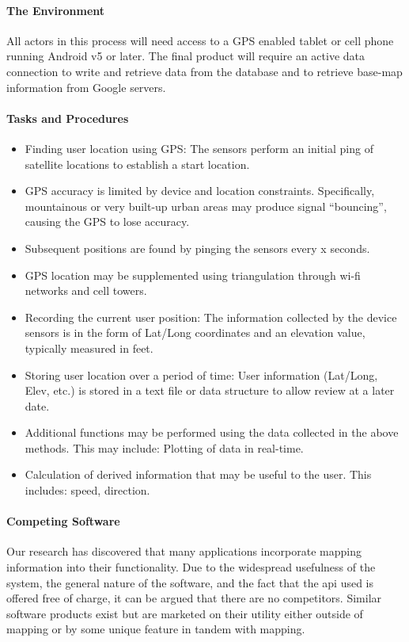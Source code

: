 ﻿\documentclass{article}
\begin{document}
\paragraph{The Environment}
All actors in this process will need access to a GPS enabled tablet or cell phone running Android v5 or later.  The final product will require an active data connection to write and retrieve data from the database and to retrieve base-map information from Google servers.

\paragraph{Tasks and Procedures}
\begin{itemize}
\item Finding user location using GPS: The sensors perform an initial ping of satellite locations to establish a start location.
\item GPS accuracy is limited by device and location constraints. Specifically, mountainous or very built-up urban areas may produce signal “bouncing”, causing the GPS to lose accuracy.
\item Subsequent positions are found by pinging the sensors every x seconds.
\item GPS location may be supplemented using triangulation through wi-fi networks and cell towers.
\item Recording the current user position: The information collected by the device sensors is in the form of Lat/Long coordinates and an elevation value, typically measured in feet.
\item Storing user location over a period of time: User information (Lat/Long, Elev, etc.) is stored in a text file or data structure to allow review at a later date.
\item Additional functions may be performed using the data collected in the above methods. This may include: Plotting of data in real-time.
\item Calculation of derived information that may be useful to the user. This includes: speed, direction.
\end{itemize}

\paragraph{Competing Software}
Our research has discovered that many applications incorporate mapping information into their functionality. Due to the widespread usefulness of the system, the general nature of the software, and the fact that the api used is offered free of charge, it can be argued that there are no competitors. Similar software products exist but are marketed on their utility either outside of mapping or by some unique feature in tandem with mapping.
\end{document}
